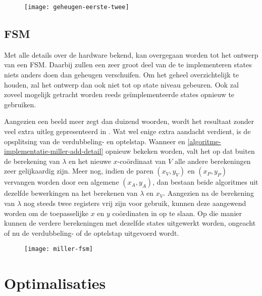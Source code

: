 \begin{figure}[h]
	\centering
		\texttt{[image: geheugen-eerste-twee]}
\end{figure}

\subsection{FSM}

Met alle details over de hardware bekend, kan overgegaan worden tot het ontwerp van een FSM. Daarbij zullen een zeer groot deel van de te implementeren states niets anders doen dan geheugen verschuifen. Om het geheel overzichtelijk te houden, zal het ontwerp dan ook niet tot op state niveau gebeuren. Ook zal zoveel mogelijk getracht worden reeds ge\"implementeerde states opnieuw te gebruiken.

Aangezien een beeld meer zegt dan duizend woorden, wordt het resultaat zonder veel extra uitleg gepresenteerd in . Wat wel enige extra aandacht verdient, is de opsplitsing van de verdubbeling- en optelstap. Wanneer  en \ref{algoritme-implementatie-miller-add-detail} opnieuw bekeken worden, valt het op dat buiten de berekening van $\lambda$ en het nieuwe $x$-co\"ordinaat van $V$ alle andere berekeningen zeer gelijkaardig zijn. Meer nog, indien de paren $(x_V, y_V)$ en $(x_P, y_P)$ vervangen worden door een algemene $(x_A, y_A)$, dan bestaan beide algoritmes uit dezelfde bewerkingen na het berekenen van $\lambda$ en $x_V$. Aangezien na de berekening van $\lambda$ nog steeds twee registers vrij zijn voor gebruik, kunnen deze aangewend worden om de toepasselijke $x$ en $y$ co\"ordinaten in op te slaan. Op die manier kunnen de verdere berekeningen met dezelfde states uitgewerkt worden, ongeacht of nu de verdubbeling- of de optelstap uitgevoerd wordt.

\begin{figure}[h]
	\centering
		\texttt{[image: miller-fsm]}
\end{figure}

\section{Optimalisaties}

